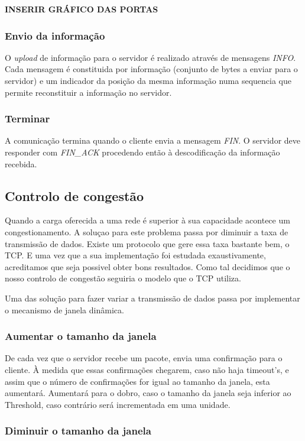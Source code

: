\documentclass{article}
\begin{document}
\textbf{INSERIR GRÁFICO DAS PORTAS}


\subsubsection{Envio da informação}
O \textit{upload} de informação para o servidor é realizado através de mensagens \textit{INFO}. Cada mensagem é constituida por informação (conjunto de bytes a enviar para o servidor) e um indicador da posição da mesma informação numa sequencia que permite reconstituir a informação no servidor.

\subsubsection{Terminar}
A comunicação termina quando o cliente envia a mensagem \textit{FIN}. O servidor deve responder com \textit{FIN\_ACK} procedendo então à descodificação da informação recebida.

\subsection{Controlo de congestão}

Quando a carga oferecida a uma rede é superior à sua capacidade acontece um congestionamento. A soluçao para este problema passa por diminuir a taxa de transmissão de dados.
Existe um protocolo que gere essa taxa bastante bem, o TCP. E uma vez que a sua implementação foi estudada exaustivamente, acreditamos que seja possivel obter bons resultados. Como tal decidimos que o nosso controlo de congestão seguiria o modelo que o TCP utiliza.

Uma das solução para fazer variar a transmissão de dados passa por implementar o mecanismo de janela dinâmica.

\subsubsection{Aumentar o tamanho da janela}

De cada vez que o servidor recebe um pacote, envia uma confirmação para o cliente. À medida que essas confirmações chegarem, caso não haja timeout’s, e assim que o número de confirmações for igual ao tamanho da janela, esta aumentará.
Aumentará para o dobro, caso o tamanho da janela seja inferior ao Threshold, caso contrário será incrementada em uma unidade.

\subsubsection{Diminuir o tamanho da janela}
\end{document}
